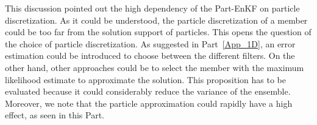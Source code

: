 This discussion pointed out the high dependency of the Part-EnKF on particle discretization. As it could be understood, the particle discretization of a member could be too far from the solution support of particles. This opens the question of the choice of particle discretization. As suggested in Part~\ref{App_1D}, an error estimation could be introduced to choose between the different filters. On the other hand, other approaches could be to select the member with the maximum likelihood estimate to approximate the solution. This proposition has to be evaluated because it could considerably reduce the variance of the ensemble. Moreover, we note that the particle approximation could rapidly have a high effect, as seen in this Part.

\newpage

